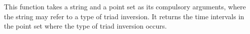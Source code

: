 \noindent This function takes a string and a point
set as its compulsory arguments, where the string
may refer to a type of triad inversion. It returns
the time intervals in the point set where the type of
triad inversion occurs.






















